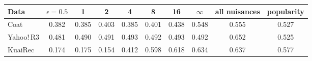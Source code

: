 \begin{tabular}{lccccccccc}
\toprule
Data & $\epsilon=0.5$ & 1 & 2 & 4 & 8 & 16 & $\infty$ & all nuisances & popularity\\
\midrule
Coat & 0.382 & 0.385 & 0.403 & 0.385 & 0.401 & 0.438 & 0.548 & 0.555 & 0.527\\
Yahoo!\,R3 & 0.481 & 0.490 & 0.491 & 0.493 & 0.492 & 0.493 & 0.492 & 0.652 & 0.525\\
KuaiRec & 0.174 & 0.175 & 0.154 & 0.412 & 0.598 & 0.618 & 0.634 & 0.637 & 0.577\\
\bottomrule
\end{tabular}
